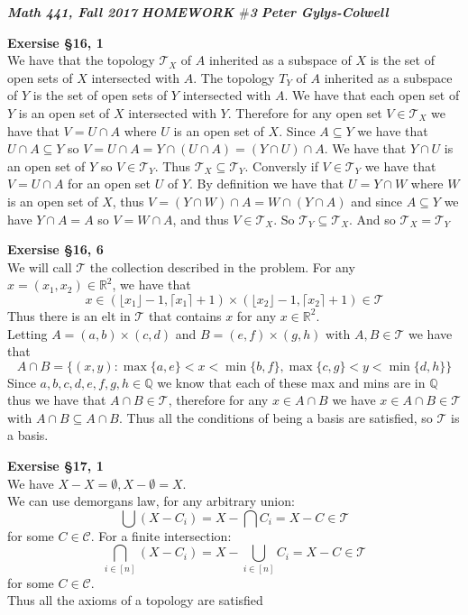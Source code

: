 \documentclass[12pt]{article}
\newenvironment{ques}[1]{\textbf{Exersise #1}\vspace{1 mm}\\ }{\bigskip}
\theoremstyle{definition}
\newcommand{\R}{\mathbb R}
\newcommand{\Q}{\mathbb Q}
\newcommand\floor[1]{\lfloor#1\rfloor}
\newcommand\ceil[1]{\lceil#1\rceil}
\newcommand{\T}{\mathcal{T}}
\begin{document}
\noindent \textit{\textbf{Math 441, Fall 2017}} \hspace{1.3cm}
\textit{\textbf{HOMEWORK $\#$3}} \hspace{1.3cm} \textit{\textbf{Peter
Gylys-Colwell}} 

\vspace{1cm}

\begin{ques}{\S 16, 1}
	We have that the topology $\T_X$ of $A$ inherited as a subspace of $X$ is
	the set of open sets of $X$ intersected with $A$. The topology $T_Y$ of $A$
	inherited as a subspace of $Y$ is the set of open sets of $Y$ intersected
	with $A$. We have that each open set of $Y$ is an open set of $X$
	intersected with $Y$. Therefore for any open set $V \in \T_X$ we have that
	$V = U \cap A$ where $U$ is an open set of $X$. Since $A \subseteq Y$ we
	have that $U \cap A \subseteq Y$ so $V = U \cap A = Y \cap (U \cap A) = (Y \cap
	U) \cap A$. We have that $Y \cap U$ is an open set of $Y$ so $V \in \T_Y$.
	Thus $\T_X \subseteq \T_Y$. Conversly if $V \in \T_Y$ we have that $V = U
	\cap A$ for an open set $U$ of $Y$. By definition we have that $U = Y \cap
	W$ where $W$ is an open set of $X$, thus $V = (Y \cap W) \cap A = W \cap (Y
	\cap A)$ and since $A \subseteq Y$ we have $Y \cap A = A$ so $V = W \cap
	A$, and thus $V \in \T_X$. So $\T_Y \subseteq \T_X$. And so $\T_X = \T_Y$
\end{ques}

\begin{ques}{\S 16, 6}
	We will call $\T$ the collection described in the problem. For any $x =
	(x_1, x_2) \in \R^2$, we have that 
	$$ x \in (\floor{x_1} - 1, \ceil{x_1} + 1) \times (\floor{x_2} - 1,
	\ceil{x_2} + 1) \in \T$$
	Thus there is an elt in $\T$ that contains $x$ for any $x \in \R^2$.\\
	Letting $A = (a,b) \times (c,d)$ and $B = (e,f) \times (g,h)$ with $A, B
	\in \T$ we have that
	$$A \cap B = \{(x,y): \max\{a,e\} < x < \min\{b,f\}, \max\{c, g\} < y <
	\min\{d,h\}\}$$
	Since $a,b,c,d,e,f,g,h \in \Q$ we know that each of these max and mins are
	in $\Q$ thus we have that $A \cap B \in \T$, therefore for any $x \in A
	\cap B$ we have $x \in A \cap B \in \T$ with $A \cap B \subseteq A \cap B$.
	Thus all the conditions of being a basis are satisfied, so $\T$ is a basis.
	
\end{ques}

\begin{ques}{\S 17, 1}
	We have $X - X = \emptyset, X - \emptyset = X$.\\
	We can use demorgans law, for any arbitrary union:
	$$\bigcup (X - C_i) = X - \bigcap C_i = X - C \in \T$$
	for some $C \in \mathcal C$. For a finite intersection:
	$$\bigcap_{i \in [n]} (X - C_i) = X - \bigcup_{i \in [n]} C_i = X - C \in \T$$
	for some $C \in \mathcal C$.\\
	Thus all the axioms of a topology are satisfied
\end{ques}
\end{document}
